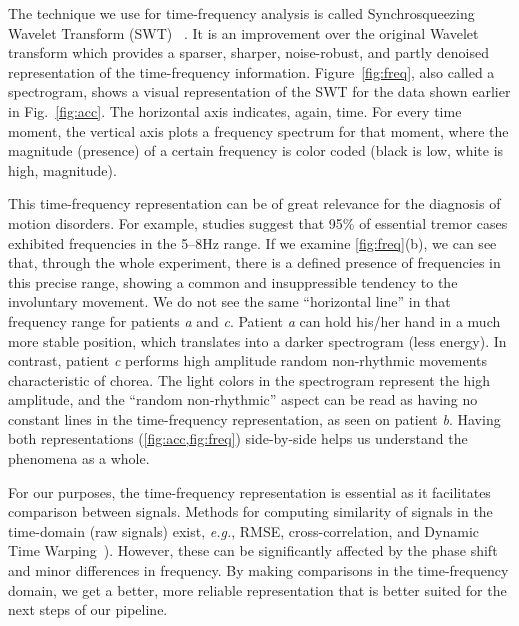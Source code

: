 The technique we use for time-frequency analysis is called Synchrosqueezing Wavelet Transform (SWT)~ \citep{MIHALEC2016324}. It is an improvement over the original Wavelet transform \citep{wavelet} which provides a sparser, sharper, noise-robust, and partly denoised representation of the time-frequency information. Figure~\ref{fig:freq}, also called a spectrogram, shows a visual representation of the SWT for the data shown earlier in Fig.~\ref{fig:acc}. The horizontal axis indicates, again, time. For every time moment, the vertical axis plots a frequency spectrum for that moment, where the magnitude (presence) of a certain frequency is color coded (black is low, white is high, magnitude).

This time-frequency representation can be of great relevance for the diagnosis of motion disorders. For example, studies suggest that 95\% of essential tremor cases exhibited frequencies in the 5--8Hz range. If we examine \cref{fig:freq}(b), we can see that,  through the whole experiment, there is a defined presence of frequencies in this precise range, showing a common and insuppressible tendency to the involuntary movement. We do not see the same ``horizontal line'' in that frequency range for patients \textit{a} and \textit{c}. Patient \textit{a} can hold his/her hand in a much more stable position, which translates into a darker spectrogram (less energy). In contrast, patient \textit{c} performs high amplitude random non-rhythmic movements characteristic of chorea. The light colors in the spectrogram represent the high amplitude, and the ``random non-rhythmic'' aspect can be read as having no constant lines in the time-frequency representation, as seen on patient \textit{b}. Having both representations (\cref{fig:acc,fig:freq}) side-by-side helps us understand the phenomena as a whole. 

For our purposes, the time-frequency representation is essential as it facilitates comparison between signals. Methods for computing similarity of signals in the time-domain (raw signals) exist, \emph{e.g.}, RMSE, cross-correlation, and Dynamic Time Warping~\citep{Gupta1996}). However, these can be significantly affected by the phase shift and minor differences in frequency. By making comparisons in the time-frequency domain, we get a better, more reliable representation that is better suited for the next steps of our pipeline.

